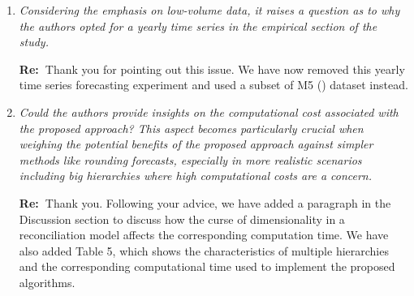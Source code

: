 \documentclass[11pt,a4paper]{article}
\newcommand{\RE}[2][Re:~]{{\color{blue}\textbf{#1}#2}}
\begin{document}
\begin{enumerate}
  \item \textit{Considering the emphasis on low-volume data, it raises a question as to why the authors opted for a yearly time series in the empirical section of the study.}
 
  \RE{Thank you for pointing out this issue. We have now removed this yearly time series forecasting experiment and used a subset of M5 (\citealp{makridakisM5AccuracyCompetition2022}) dataset instead.}
  
  \item \textit{Could the authors provide insights on the computational cost associated with the proposed approach? This aspect becomes particularly crucial when weighing the potential benefits of the proposed approach against simpler methods like rounding forecasts, especially in more realistic scenarios including big hierarchies where high computational costs are a concern.}
  
  \RE{Thank you. Following your advice, we have added a paragraph in the Discussion section to discuss how the curse of dimensionality in a reconciliation model affects the corresponding computation time. We have also added Table 5, which shows the characteristics of multiple hierarchies and the corresponding computational time used to implement the proposed algorithms.}


\end{enumerate}

% 
% 
\printbibliography
\end{document}
